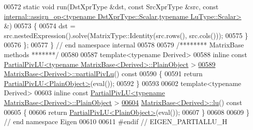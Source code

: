 \begin{DoxyCode}
00572   \textcolor{keyword}{static} \textcolor{keywordtype}{void} run(DstXprType &dst, \textcolor{keyword}{const} SrcXprType &src, \textcolor{keyword}{const} 
      \hyperlink{struct_eigen_1_1internal_1_1assign__op}{internal::assign\_op<typename DstXprType::Scalar,typename LuType::Scalar>}
       &)
00573   \{
00574     dst = src.nestedExpression().solve(MatrixType::Identity(src.rows(), src.cols()));
00575   \}
00576 \};
00577 \} \textcolor{comment}{// end namespace internal}
00578 
00579 \textcolor{comment}{/******** MatrixBase methods *******/}
00580 
00587 \textcolor{keyword}{template}<\textcolor{keyword}{typename} Derived>
00588 \textcolor{keyword}{inline} \textcolor{keyword}{const} \hyperlink{group___l_u___module_class_eigen_1_1_partial_piv_l_u}{PartialPivLU<typename MatrixBase<Derived>::PlainObject}
      >
\hyperlink{group___core___module_a6199d8aaf26c1b8ac3097fdfa7733a1e}{00589} \hyperlink{group___core___module_class_eigen_1_1_matrix_base}{MatrixBase<Derived>::partialPivLu}()\textcolor{keyword}{ const}
00590 \textcolor{keyword}{}\{
00591   \textcolor{keywordflow}{return} \hyperlink{group___l_u___module_class_eigen_1_1_partial_piv_l_u}{PartialPivLU<PlainObject>}(eval());
00592 \}
00593 
00602 \textcolor{keyword}{template}<\textcolor{keyword}{typename} Derived>
00603 \textcolor{keyword}{inline} \textcolor{keyword}{const} \hyperlink{group___l_u___module_class_eigen_1_1_partial_piv_l_u}{PartialPivLU<typename MatrixBase<Derived>::PlainObject}
      >
\hyperlink{group___core___module_afb312afbfe960cbda67811552d876fae}{00604} \hyperlink{group___core___module_class_eigen_1_1_matrix_base}{MatrixBase<Derived>::lu}()\textcolor{keyword}{ const}
00605 \textcolor{keyword}{}\{
00606   \textcolor{keywordflow}{return} \hyperlink{group___l_u___module_class_eigen_1_1_partial_piv_l_u}{PartialPivLU<PlainObject>}(eval());
00607 \}
00608 
00609 \} \textcolor{comment}{// end namespace Eigen}
00610 
00611 \textcolor{preprocessor}{#endif // EIGEN\_PARTIALLU\_H}
\end{DoxyCode}
